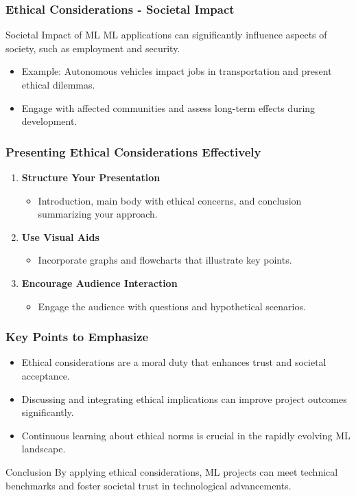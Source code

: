 \documentclass[aspectratio=169]{beamer}
\begin{document}
\begin{frame}[fragile]
    \frametitle{Ethical Considerations - Societal Impact}
    \begin{block}{Societal Impact of ML}
        ML applications can significantly influence aspects of society, such as employment and security. 
        \begin{itemize}
            \item Example: Autonomous vehicles impact jobs in transportation and present ethical dilemmas.
            \item Engage with affected communities and assess long-term effects during development.
        \end{itemize}
    \end{block}
\end{frame}

\begin{frame}[fragile]
    \frametitle{Presenting Ethical Considerations Effectively}
    \begin{enumerate}
        \item \textbf{Structure Your Presentation}
        \begin{itemize}
            \item Introduction, main body with ethical concerns, and conclusion summarizing your approach.
        \end{itemize}
        
        \item \textbf{Use Visual Aids}
        \begin{itemize}
            \item Incorporate graphs and flowcharts that illustrate key points.
        \end{itemize}

        \item \textbf{Encourage Audience Interaction}
        \begin{itemize}
            \item Engage the audience with questions and hypothetical scenarios.
        \end{itemize}
    \end{enumerate}
\end{frame}

\begin{frame}[fragile]
    \frametitle{Key Points to Emphasize}
    \begin{itemize}
        \item Ethical considerations are a moral duty that enhances trust and societal acceptance.
        \item Discussing and integrating ethical implications can improve project outcomes significantly.
        \item Continuous learning about ethical norms is crucial in the rapidly evolving ML landscape.
    \end{itemize}
    
    \begin{block}{Conclusion}
        By applying ethical considerations, ML projects can meet technical benchmarks and foster societal trust in technological advancements.
    \end{block}
\end{frame}
\end{document}
